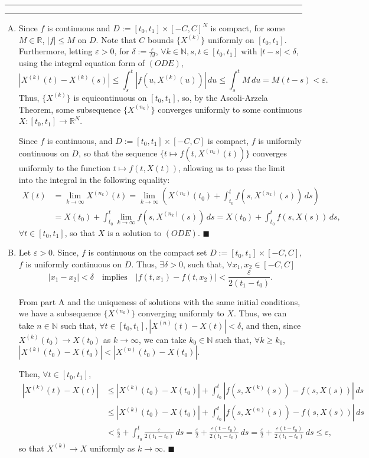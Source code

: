 \documentclass[11pt]{article}
\newcounter{questionCounter}
\newcounter{partCounter}[questionCounter]
\newenvironment{question}[2][\arabic{questionCounter}]{%
    \setcounter{partCounter}{0}%
    \vspace{.25in} \hrule \vspace{0.5em}%
        \noindent{\bf #2}%
    \vspace{0.8em} \hrule \vspace{.10in}%
    \addtocounter{questionCounter}{1}%
}{}
\renewcommand{\qed}{\quad $\blacksquare$}
\newcommand{\N}{\mathbb{N}} %
\newcommand{\R}{\mathbb{R}} %
\newcommand{\e}{\varepsilon} %
\begin{document}
\newpage
\begin{question}{Problem 4}
\begin{enumerate}[A)]
\item Since $f$ is continuous and $D := [t_0,t_1] \times [-C,C]^N$ is compact,
for some $M \in \R$, $|f| \leq M$ on $D$. Note that $C$ bounds $\{X^{(k)}\}$
uniformly on $[t_0,t_1]$. Furthermore, letting $\e > 0$, for
$\delta := \frac{\e}{M}$, $\forall k \in \N, s,t \in [t_0,t_1]$ with
$|t - s| < \delta$, using the integral equation form of $(ODE)$,
\[|X^{(k)}(t) - X^{(k)}(s)|
 \leq \int_s^t |f(u,X^{(k)}(u))| \, du
 \leq \int_s^t M \, du
 = M(t - s)
 < \e.
\]
Thus, $\{X^{(k)}\}$ is equicontinuous on $[t_0,t_1]$, so, by the Ascoli-Arzela
Theorem, some subsequence $\{X^{(n_k)}\}$ converges uniformly to some
continuous $X : [t_0,t_1] \rightarrow \R^N$.

Since $f$ is continuous, and $D := [t_0,t_1] \times [-C,C]$ is compact, $f$ is
uniformly continuous on $D$, so that the sequence
$\{t \mapsto f(t,X^{(n_k)}(t))\}$ converges uniformly to the function
$t \mapsto f(t,X(t))$, allowing us to pass the limit into the integral in the
following equality:
\begin{align*}
X(t)
 & = \lim_{k \rightarrow \infty} X^{(n_k)}(t)
   = \lim_{k \rightarrow \infty} \left( X^{(n_k)}(t_0)
   + \int_{t_0}^t f(s,X^{(n_k)}(s)) \, ds \right) \\
 & = X(t_0) + \int_{t_0}^t \lim_{k \rightarrow \infty} f(s,X^{(n_k)}(s)) \, ds
   = X(t_0) + \int_{t_0}^t f(s,X(s)) \, ds,
\end{align*}
$\forall t \in [t_0,t_1]$, so that $X$ is a solution to $(ODE)$. \qed

\item Let $\e > 0$. Since, $f$ is continuous on the compact set
$D := [t_0,t_1] \times [-C,C]$, $f$ is uniformly continuous on $D$. Thus,
$\exists \delta > 0$, such that, $\forall x_1,x_2 \in [-C,C]$
\[|x_1 - x_2| < \delta
    \quad \mbox{implies} \quad
   |f(t,x_1) - f(t,x_2)| < \frac{\e}{2(t_1 - t_0)}.
\]

From part A and the uniqueness of solutions with the same initial
conditions, we have a subsequence $\{X^{(n_k)}\}$ converging uniformly to $X$.
Thus, we can take $n \in \N$ such that,
$\forall t \in [t_0,t_1], |X^{(n)}(t) - X(t)| < \delta$, and then, since
$X^{(k)}(t_0) \rightarrow X(t_0)$ as $k \rightarrow \infty$, we can take
$k_0 \in \N$ such that, $\forall k \geq k_0$,
$|X^{(k)}(t_0) - X(t_0)| < |X^{(n)}(t_0) - X(t_0)|$.

Then, $\forall t \in [t_0,t_1]$,
\begin{align*}
|X^{(k)}(t) - X(t)|
 & \leq |X^{(k)}(t_0) - X(t_0)|
 +      \int_{t_0}^t |f(s,X^{(k)}(s)) - f(s,X(s))| \, ds \\
 & \leq |X^{(k)}(t_0) - X(t_0)|
 +      \int_{t_0}^t |f(s,X^{(n)}(s)) - f(s,X(s))| \, ds \\
 & <    \frac{\e}{2} + \int_{t_0}^t \frac{\e}{2(t_1 - t_0)}\, ds
   =    \frac{\e}{2} + \frac{\e(t - t_0)}{2(t_1 - t_0)}\, ds
   =    \frac{\e}{2} + \frac{\e(t - t_0)}{2(t_1 - t_0)}\, ds
   \leq \e,
\end{align*}
so that $X^{(k)} \rightarrow X$ uniformly as $k \rightarrow \infty$. \qed

\end{enumerate}
\end{question}
\end{document}
